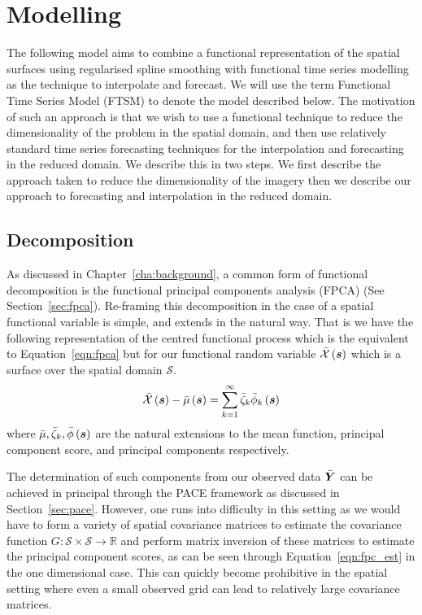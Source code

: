 \section{Modelling \label{sec:ftsm_model}}
The following model aims to combine a functional representation of the spatial surfaces using regularised spline smoothing with functional time series modelling as the technique to interpolate and forecast. We will use the term Functional Time Series Model (FTSM) to denote the model described below. 
The motivation of such an approach is that we wish to use a functional technique to reduce the dimensionality of the problem in the spatial domain, and then use relatively standard time series forecasting techniques for the interpolation and forecasting in the reduced domain.
We describe this in two steps.
We first describe the approach taken to reduce the dimensionality of the imagery then we describe our approach to forecasting and interpolation in the reduced domain.

\subsection{Decomposition}
As discussed in Chapter~\ref{cha:background}, a common form of functional decomposition is the functional principal components analysis (FPCA) (See Section~\ref{sec:fpca}).
Re-framing this decomposition in the case of a spatial functional variable is simple, and extends in the natural way.
That is we have the following representation of the centred functional process which is the equivalent to Equation~\eqref{eqn:fpca} but for our functional random variable $\bar{\mathcal{X}}\left(\bm{{s}}\right)$ which is a surface over the spatial domain $\mathcal{S}$.
\begin{equation}
	\bar{\mathcal{X}}\left(\bm{{s}}\right) -\bar{\mu}\left(\bm{{s}}\right) = \sum_{k=1}^{\infty} \bar{\zeta}_k \bar{\phi}_k \left( \bm{{s}} \right)
	\label{eqn:space_fpca}
\end{equation}
where $\bar{\mu}, \bar{\zeta}_k, \bar{\phi}\left(\bm{{s}}\right)$ are the natural extensions to the mean function, principal component score, and principal components respectively. 

The determination of such components from our observed data $\bar{\bm{{Y}}}$ can be achieved in principal through the PACE framework as discussed in Section~\ref{sec:pace}.
However, one runs into difficulty in this setting as we would have to form a variety of spatial covariance matrices to estimate the covariance function $G: \mathcal{S} \times \mathcal{S} \to \mathbb{R}$ and perform matrix inversion of these matrices to estimate the principal component scores, as can be seen through Equation~\eqref{eqn:fpc_est} in the one dimensional case.
This can quickly become prohibitive in the spatial setting where even a small observed grid can lead to relatively large covariance matrices. 

